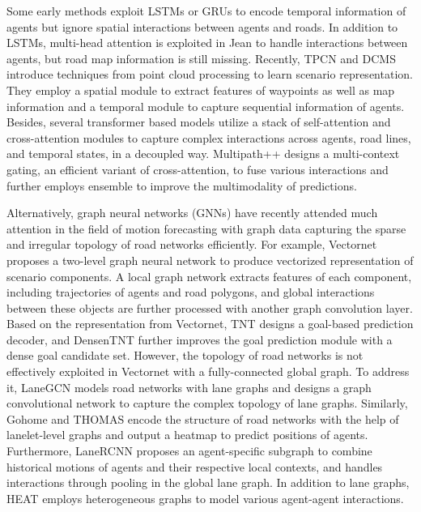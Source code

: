 \documentclass[letterpaper, 10 pt, conference]{ieeeconf}
\begin{document}
Some early methods \cite{alahi2016social, gupta2018social} exploit LSTMs or GRUs to encode temporal information of agents but ignore spatial interactions between agents and roads. In addition to LSTMs, multi-head attention is exploited in 
Jean \cite{9197340} to handle interactions between agents,  but road map information is still missing.
Recently, TPCN \cite{ye2021tpcn} and DCMS \cite{ye2022dcms} introduce techniques from point cloud processing to learn scenario representation. They employ a spatial module to extract features of waypoints as well as map information and a temporal module to capture sequential information of agents. 
Besides, several transformer based models \cite{ngiam2021scene,girgis2021latent,zhou2022hivt} utilize a stack of self-attention and cross-attention modules to capture complex interactions across agents, road lines, and temporal states, in a decoupled way. Multipath++ \cite{varadarajan2021multipath} designs a multi-context gating,  an efficient variant of cross-attention, to fuse various interactions and further employs ensemble to improve the multimodality of predictions.
 
Alternatively, graph neural networks (GNNs) have recently attended much attention in the field of motion forecasting with graph data capturing the sparse and irregular topology of road networks efficiently. For example, Vectornet \cite{gao2020vectornet} proposes a two-level graph neural network to produce vectorized representation of scenario components. A local graph network extracts features of each component, including trajectories of agents and road polygons, and global interactions between these objects are further processed with another graph convolution layer. Based on the representation from Vectornet, TNT \cite{zhao2020tnt} designs a goal-based prediction decoder, and DensenTNT \cite{gu2021densetnt} further improves the goal prediction module with a dense goal candidate set.
However, the topology of road networks is not effectively exploited in Vectornet with a fully-connected global graph. To address it, LaneGCN \cite{liang2020learning} models road networks with lane graphs and designs a graph convolutional network to capture the complex topology of lane graphs. Similarly,  Gohome \cite{gilles2021gohome} and THOMAS \cite{gilles2022thomas} encode the structure of road networks with the help of lanelet-level graphs and  output a heatmap to predict positions of agents. Furthermore, LaneRCNN \cite{zeng2021lanercnn} proposes an agent-specific subgraph to combine historical motions of agents and their respective local contexts, and handles interactions through pooling in the global lane graph. In addition to lane graphs, HEAT \cite{mo2022multi} employs heterogeneous graphs to model various agent-agent interactions.
\end{document}
